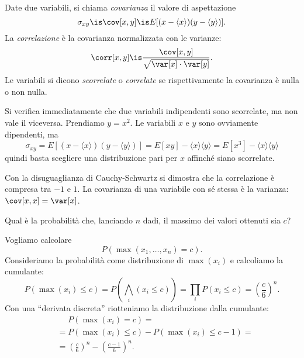
\begin{definition}[Covarianza]
	Date due variabili, si chiama \emph{covarianza} il valore di aspettazione
	\begin{equation*}
		\sigma_{xy} \is \cov[x,y] \is E[(x-\langle x\rangle)(y-\langle y\rangle)].
	\end{equation*}
	La \emph{correlazione} è la covarianza normalizzata con le varianze:
	\begin{equation*}
		\corr[x,y] \is \frac{\cov[x,y]}{\sqrt{\var[x]\cdot\var[y]}}.
	\end{equation*}
	Le variabili si dicono \emph{scorrelate} o \emph{correlate} se rispettivamente la covarianza è nulla o non nulla.
\end{definition}

Si verifica immediatamente che due variabili indipendenti sono scorrelate, ma non vale il viceversa.
Prendiamo $y=x^2$. Le variabili $x$ e $y$ sono ovviamente dipendenti, ma
\begin{equation*}
	\sigma_{xy} = E[(x-\langle x\rangle)(y-\langle y\rangle)] = E[xy] - \langle x\rangle\langle y\rangle = E[x^3] - \langle x\rangle\langle y\rangle
\end{equation*}
quindi basta scegliere una distribuzione pari per $x$ affinché siano scorrelate.

Con la disuguaglianza di Cauchy-Schwartz si dimostra che la correlazione è compresa tra $-1$ e $1$.
La covarianza di una variabile con sé stessa è la varianza: $\cov[x,x]=\var[x]$.

\begin{exercise}
	Qual è la probabilità che, lanciando $n$ dadi, il massimo dei valori ottenuti sia $c$?
\end{exercise}

\begin{solution*}
	Vogliamo calcolare
	\begin{equation*}
		P(\max(x_1,\dots,x_n) = c).
	\end{equation*}
	Consideriamo la probabilità come distribuzione di $\max(x_i)$ e calcoliamo la cumulante:
	\begin{equation*}
		P(\max(x_i) \le c) = P\left(\bigwedge_i(x_i \le c)\right) = \prod_i P(x_i \le c) = \left (\frac c6 \right)^n.
	\end{equation*}
	Con una ``derivata discreta'' riotteniamo la distribuzione dalla cumulante:
	\begin{align*}
		&\phantom{{}={}} P(\max(x_i) = c) = \\
		&= P(\max(x_i) \le c) - P(\max(x_i) \le c-1) = \\
		&= \left (\frac c6 \right)^n - \left (\frac {c-1}6 \right)^n.
	\end{align*}
\end{solution*}


